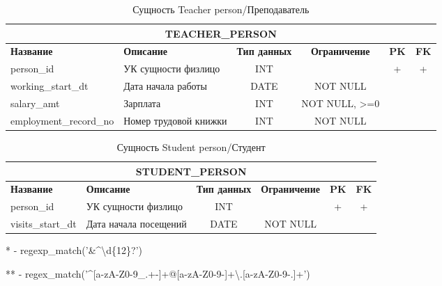 \documentclass[a4paper]{article}
\begin{document}
\begin{table}[!hbt]
\begin{tabularx}{\textwidth}{|l|X|c|c|c|c|}
\hline
\multicolumn{6}{|c|}{\textbf{TEACHER\_PERSON}}                                                                          \\ \hline
\textbf{Название}      & \textbf{Описание}     & \textbf{Тип данных} & \textbf{Ограничение} & \textbf{PK} & \textbf{FK} \\ \hline
person\_id             & УК сущности физлицо   & INT                 &                      & +           & +           \\ \hline
working\_start\_dt     & Дата начала работы    & DATE        & NOT NULL             &             &             \\ \hline
salary\_amt            & Зарплата              & INT                 &            NOT NULL, >=0          &             &             \\ \hline
employment\_record\_no & Номер трудовой книжки & INT                 & NOT NULL             &             &             \\ \hline
\end{tabularx}
\caption{Сущность Teacher person/Преподаватель}
\end{table}

\begin{table}[!hbt]
\begin{tabularx}{\textwidth}{|l|X|c|c|c|c|}
\hline
\multicolumn{6}{|c|}{\textbf{STUDENT\_PERSON}}                                                                          \\ \hline
\textbf{Название}      & \textbf{Описание}     & \textbf{Тип данных} & \textbf{Ограничение} & \textbf{PK} & \textbf{FK} \\ \hline
person\_id             & УК сущности физлицо   & INT                 &                      & +           & +           \\ \hline
visits\_start\_dt      & Дата начала посещений & DATE        & NOT NULL             &             &             \\ \hline
\end{tabularx}
\caption{Сущность Student person/Студент}
\end{table}

 * - regexp\_match('\&\^{}\textbackslash{}d\{12\}?\textdollar{}')

 ** - regex\_match('\^{}[a-zA-Z0-9\_.+-]+@[a-zA-Z0-9-]+\textbackslash{}.[a-zA-Z0-9-.]+\textdollar{}')
 
\end{document}
